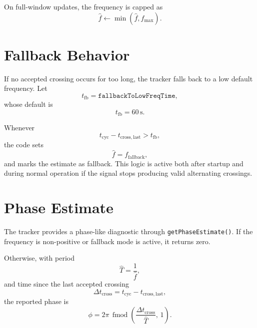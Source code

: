 \documentclass[conference]{IEEEtran}
\begin{document}
    On full-window updates, the frequency is capped as
    \begin{equation}
        \hat f \leftarrow \min(\hat f, f_{\max}).
    \end{equation}

    \section{Fallback Behavior}

    If no accepted crossing occurs for too long, the tracker falls back to a low
    default frequency. Let
    \begin{equation}
        t_{\mathrm{fb}} = \texttt{fallbackToLowFreqTime},
    \end{equation}
    whose default is
    \begin{equation}
        t_{\mathrm{fb}} = 60\,\text{s}.
    \end{equation}

    Whenever
    \begin{equation}
        t_{\mathrm{cyc}} - t_{\mathrm{cross,last}} > t_{\mathrm{fb}},
    \end{equation}
    the code sets
    \begin{equation}
        \hat f = f_{\mathrm{fallback}},
    \end{equation}
    and marks the estimate as fallback. This logic is active both after startup
    and during normal operation if the signal stops producing valid alternating
    crossings.

    \section{Phase Estimate}

    The tracker provides a phase-like diagnostic through
    \texttt{getPhaseEstimate()}. If the frequency is non-positive or fallback mode
    is active, it returns zero.

    Otherwise, with period
    \begin{equation}
        \hat T = \frac{1}{\hat f},
    \end{equation}
    and time since the last accepted crossing
    \begin{equation}
        \Delta t_{\mathrm{cross}}
        =
        t_{\mathrm{cyc}} - t_{\mathrm{cross,last}},
    \end{equation}
    the reported phase is
    \begin{equation}
        \phi
        =
        2\pi\,
        \operatorname{fmod}\!\left(
        \frac{\Delta t_{\mathrm{cross}}}{\hat T},\,1
        \right).
    \end{equation}
\end{document}
